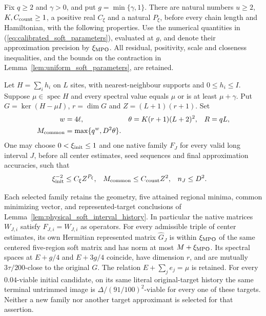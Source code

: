 \begin{theorem}
    \label{thm:physical_soft_resampling_tree}
    \leanok
    Fix $q\ge2$ and $\gamma>0$, and put $g=\min\{\gamma,1\}$.
    There are natural numbers $u\ge2$, $K,C_{\rm count}\ge1$, a positive
    real $C_\xi$ and a natural $P_\xi$, before every chain length and
    Hamiltonian, with the following properties. Use the numerical
    quantities in (\ref{eq:calibrated_soft_parameters}), evaluated at $g$,
    and denote their approximation precision by $\xi_{\rm MPO}$.
    All residual, positivity, scale and closeness inequalities, and
    the bounds on the contraction in
    Lemma~\ref{lem:uniform_soft_parameters}, are retained.

    Let $H=\sum_i h_i$ on $L$ sites, with nearest-neighbour supports and
    $0\le h_i\le I$. Suppose $\mu\in\operatorname{spec}H$ and every
    spectral value equals $\mu$ or is at least $\mu+\gamma$.
    Put $G=\ker(H-\mu I)$, $r=\dim G$ and $Z=(L+1)(r+1)$. Set
    \begin{align}
        w              & =4\ell,                 & \theta & =K(r+1)(L+2)^2, & R & =qL,\notag \\
        M_{\rm common} & =\max\{q^w,D^2\theta\}.
        \label{eq:physical_soft_tree_schedule}
    \end{align}
    One may choose $0<\xi_{\rm init}\le1$ and one native family $F_J$
    for every valid long interval $J$, before all center estimates,
    seed sequences and final approximation accuracies, such that
    \begin{align}
        \xi_{\rm init}^{-2} & \le C_\xi Z^{P_\xi},  &
        M_{\rm common}      & \le C_{\rm count}Z^2, & n_J & \le D^2.
        \label{eq:physical_soft_tree_size}
    \end{align}

    Each selected family retains the geometry, five attained regional
    minima, common minimizing vector, and represented-target conclusions
    of Lemma~\ref{lem:physical_soft_interval_history}. In particular the
    native matrices $W_{J,i}$ satisfy $F_{J,i}=W_{J,i}$ as operators.
    For every admissible triple of center estimates, its own Hermitian
    represented matrix $\widehat G_J$ is within $\xi_{\rm MPO}$ of the
    same centered five-region soft matrix and has norm at most
    $M+\xi_{\rm MPO}$. Its spectral spaces at $E+g/4$ and $E+3g/4$
    coincide, have dimension $r$, and are mutually $3\tau/200$-close to
    the original $G$. The relation $E+\sum_j e_j=\mu$ is retained.
    For every $0.04$-viable initial candidate, on its same literal
    original-target history the same terminal untrimmed image is $\Delta/(91/100)^2$-viable for every one of
    these targets. Neither a new family nor another target approximant
    is selected for that assertion.


\end{theorem}

